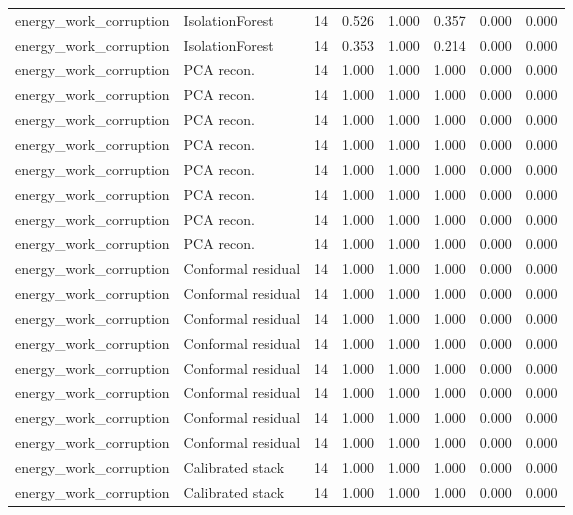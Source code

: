 {\begin{longtable}{llrrrrrr}
energy\_work\_corruption & IsolationForest & 14 & 0.526 & 1.000 & 0.357 & 0.000 & 0.000 \\
energy\_work\_corruption & IsolationForest & 14 & 0.353 & 1.000 & 0.214 & 0.000 & 0.000 \\
energy\_work\_corruption & PCA recon. & 14 & 1.000 & 1.000 & 1.000 & 0.000 & 0.000 \\
energy\_work\_corruption & PCA recon. & 14 & 1.000 & 1.000 & 1.000 & 0.000 & 0.000 \\
energy\_work\_corruption & PCA recon. & 14 & 1.000 & 1.000 & 1.000 & 0.000 & 0.000 \\
energy\_work\_corruption & PCA recon. & 14 & 1.000 & 1.000 & 1.000 & 0.000 & 0.000 \\
energy\_work\_corruption & PCA recon. & 14 & 1.000 & 1.000 & 1.000 & 0.000 & 0.000 \\
energy\_work\_corruption & PCA recon. & 14 & 1.000 & 1.000 & 1.000 & 0.000 & 0.000 \\
energy\_work\_corruption & PCA recon. & 14 & 1.000 & 1.000 & 1.000 & 0.000 & 0.000 \\
energy\_work\_corruption & PCA recon. & 14 & 1.000 & 1.000 & 1.000 & 0.000 & 0.000 \\
energy\_work\_corruption & Conformal residual & 14 & 1.000 & 1.000 & 1.000 & 0.000 & 0.000 \\
energy\_work\_corruption & Conformal residual & 14 & 1.000 & 1.000 & 1.000 & 0.000 & 0.000 \\
energy\_work\_corruption & Conformal residual & 14 & 1.000 & 1.000 & 1.000 & 0.000 & 0.000 \\
energy\_work\_corruption & Conformal residual & 14 & 1.000 & 1.000 & 1.000 & 0.000 & 0.000 \\
energy\_work\_corruption & Conformal residual & 14 & 1.000 & 1.000 & 1.000 & 0.000 & 0.000 \\
energy\_work\_corruption & Conformal residual & 14 & 1.000 & 1.000 & 1.000 & 0.000 & 0.000 \\
energy\_work\_corruption & Conformal residual & 14 & 1.000 & 1.000 & 1.000 & 0.000 & 0.000 \\
energy\_work\_corruption & Conformal residual & 14 & 1.000 & 1.000 & 1.000 & 0.000 & 0.000 \\
energy\_work\_corruption & Calibrated stack & 14 & 1.000 & 1.000 & 1.000 & 0.000 & 0.000 \\
energy\_work\_corruption & Calibrated stack & 14 & 1.000 & 1.000 & 1.000 & 0.000 & 0.000 \\

\end{longtable}}

